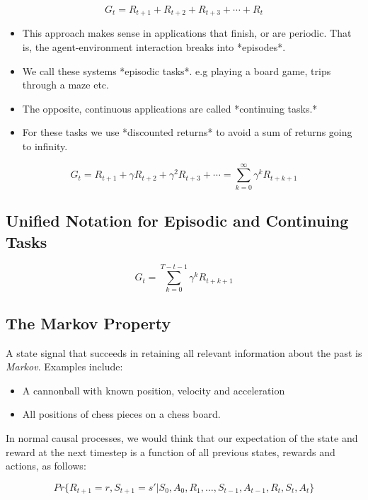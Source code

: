 \begin{equation}
	G_t = R_{t+1} + R_{t+2} + R_{t+3} + \cdots + R_t
\end{equation}

\begin{itemize}
	\item This approach makes sense in applications that finish, or are periodic. That is, the agent-environment interaction breaks into *episodes*.
	\item We call these systems *episodic tasks*. e.g playing a board game, trips through a maze etc.
	\item The opposite, continuous applications are called *continuing tasks.*
	\item For these tasks we use *discounted returns* to avoid a sum of returns going to infinity.
\end{itemize}

\begin{equation}
	G_t = R_{t+1} + \gamma R_{t+2} + \gamma^2 R_{t+3} + \cdots = \sum_{k=0}^{\infty} \gamma^k R_{t+k+1} 
\end{equation}

\subsection{Unified Notation for Episodic and Continuing Tasks}
\begin{equation}
	G_t = \sum_{k=0}^{T-t-1} \gamma^k R_{t+k+1} 
\end{equation}

\subsection{The Markov Property}
A state signal that succeeds in retaining all relevant information about the past is \textit{Markov}. Examples include:
\begin{itemize}
\item A cannonball with known position, velocity and acceleration
\item All positions of chess pieces on a chess board.
\end{itemize}

In normal causal processes, we would think that our expectation of the state and reward at the next timestep is a function of all previous states, rewards and actions, as follows:

\begin{equation}
	Pr \{R_{t+1} = r, S_{t+1} = s' | S_0, A_0, R_1, \ldots, S_{t-1}, A_{t-1}, R_t, S_t, A_t\}  
\end{equation}

